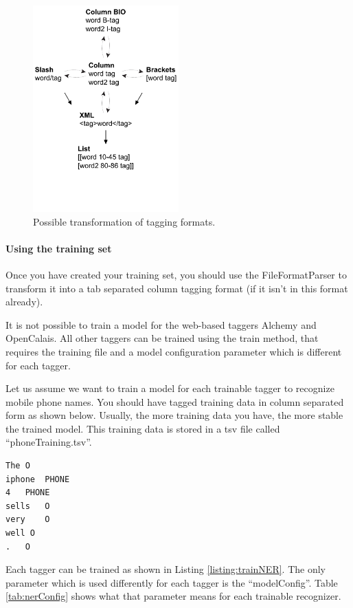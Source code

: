 \documentclass[a4paper,twoside]{book}      %
\begin{document}
\begin{figure}[ht!]
\centering
\includegraphics[width=0.5\textwidth]{img/taggingFormats.pdf}
\caption{Possible transformation of tagging formats.}
\label{fig:taggingFormats}
\end{figure}

\paragraph{Using the training set}
Once you have created your training set, you should use the FileFormatParser to transform it into a tab separated column tagging format (if it isn't in this format already).

It is not possible to train a model for the web-based taggers Alchemy and OpenCalais. All other taggers can be trained using the train method, that requires the training file and a model configuration parameter which is different for each tagger.

Let us assume we want to train a model for each trainable tagger to recognize mobile phone names. You should have tagged training data in column separated form as shown below. Usually, the more training data you have, the more stable the trained model. This training data is stored in a tsv file called ``phoneTraining.tsv''.

\begin{verbatim}
The	O
iphone	PHONE
4	PHONE
sells	O
very	O
well O
.	O
\end{verbatim}

Each tagger can be trained as shown in Listing \ref{listing:trainNER}. The only parameter which is used differently for each tagger is the ``modelConfig''. Table \ref{tab:nerConfig} shows what that parameter means for each trainable recognizer.
\end{document}
